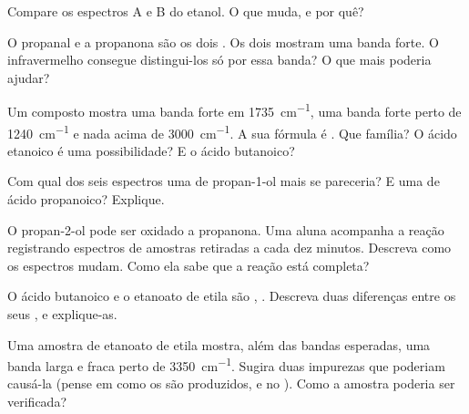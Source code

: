\begin{exercise}[$\star\star$]\label{exo:g11:infrared:8}
Compare os espectros A e B do etanol. O que muda, e por quê?
\end{exercise}

\begin{exercise}[$\star\star$]\label{exo:g11:infrared:9}
O propanal e a propanona são os dois . Os dois mostram uma
banda  forte. O infravermelho consegue distingui-los só por essa
banda? O que mais poderia ajudar?
\end{exercise}

\begin{exercise}[$\star\star$]\label{exo:g11:infrared:10}
Um composto mostra uma banda forte em \qty{1735}{cm^{-1}}, uma banda
forte perto de \qty{1240}{cm^{-1}} e nada acima de
\qty{3000}{cm^{-1}}. A sua fórmula é . Que família? O ácido
etanoico é uma possibilidade? E o ácido butanoico?
\end{exercise}

\begin{exercise}[$\star\star$]\label{exo:g11:infrared:11}
Com qual dos seis espectros uma  de propan-1-ol mais se
pareceria? E uma de ácido propanoico? Explique.
\end{exercise}

\begin{exercise}[$\star\star\star$]\label{exo:g11:infrared:12}
O propan-2-ol pode ser oxidado a propanona. Uma aluna acompanha a reação
registrando espectros de amostras retiradas a cada dez minutos. Descreva
como os espectros mudam. Como ela sabe que a reação está completa?
\end{exercise}

\begin{exercise}[$\star\star\star$]\label{exo:g11:infrared:13}
O ácido butanoico e o etanoato de etila são , .
Descreva duas diferenças entre os seus , e
explique-as.
\end{exercise}

\begin{exercise}[$\star\star\star$]\label{exo:g11:infrared:14}
Uma amostra de etanoato de etila mostra, além das bandas esperadas, uma
banda larga e fraca perto de \qty{3350}{cm^{-1}}. Sugira duas impurezas
que poderiam causá-la (pense em como os  são produzidos, e no
). Como a amostra poderia ser verificada?
\end{exercise}

